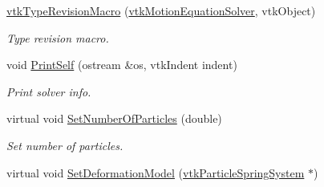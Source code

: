 \begin{DoxyCompactItemize}
\item 
\hypertarget{classvtkMotionEquationSolver_aad0ff41d843c47255c24c5e6f93be899}{
\hyperlink{classvtkMotionEquationSolver_aad0ff41d843c47255c24c5e6f93be899}{vtkTypeRevisionMacro} (\hyperlink{classvtkMotionEquationSolver}{vtkMotionEquationSolver}, vtkObject)}
\label{classvtkMotionEquationSolver_aad0ff41d843c47255c24c5e6f93be899}

\begin{DoxyCompactList}\small\item\em Type revision macro. \item\end{DoxyCompactList}\item 
\hypertarget{classvtkMotionEquationSolver_ab42c7174ce726ca24f20b0b7fa475350}{
void \hyperlink{classvtkMotionEquationSolver_ab42c7174ce726ca24f20b0b7fa475350}{PrintSelf} (ostream \&os, vtkIndent indent)}
\label{classvtkMotionEquationSolver_ab42c7174ce726ca24f20b0b7fa475350}

\begin{DoxyCompactList}\small\item\em Print solver info. \item\end{DoxyCompactList}\item 
\hypertarget{classvtkMotionEquationSolver_a22f3638538d251d459701e1c2549ffce}{
virtual void \hyperlink{classvtkMotionEquationSolver_a22f3638538d251d459701e1c2549ffce}{SetNumberOfParticles} (double)}
\label{classvtkMotionEquationSolver_a22f3638538d251d459701e1c2549ffce}

\begin{DoxyCompactList}\small\item\em Set number of particles. \item\end{DoxyCompactList}\item 
\hypertarget{classvtkMotionEquationSolver_a2a62086633d88a4713c46517d2a59743}{
virtual void \hyperlink{classvtkMotionEquationSolver_a2a62086633d88a4713c46517d2a59743}{SetDeformationModel} (\hyperlink{classvtkParticleSpringSystem}{vtkParticleSpringSystem} $\ast$)}
\label{classvtkMotionEquationSolver_a2a62086633d88a4713c46517d2a59743}


\end{DoxyCompactItemize}

